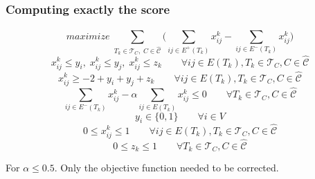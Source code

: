 \documentclass{beamer}
\begin{document}
\begin{frame}[c]
	\frametitle{Computing exactly the score}
	\begin{equation}
		maximize \; \sum_{ T_{k} \in \mathcal{T}_{C}, \; C \in
			\mathcal{\hat{C}} } \big( \sum^{}_{ij \in E^{+} (T_{k})} x_{ij}
			^{k} - \sum_{ij \in E^{-} (T_{k})} x_{ij} ^{k} \big)
	\end{equation}
	\begin{equation}
		x _{ij}^{k}  \leq y_i, \; x _{ij} ^{k} \leq y_j, \;x _{ij}^{k}  \leq z_k \quad\quad \forall ij \in E(T_{k}), T_{k} \in
		\mathcal{T}_{C}, C \in \mathcal{\hat{C}}
	\end{equation}
	\begin{equation}
		x _{ij} ^{k} \geq - 2 + y_i + y_j + z_k \quad\quad \forall ij \in E(T_k), T_k \in \mathcal{T} _{C}, C \in \hat{\mathcal{C} }
	\end{equation}
	\begin{equation}
		\sum^{}_{ij \in E^{-} (T_k)} x_{ij}^{k}  - \alpha \sum^{}_{ij \in E(T_k)}
		x_{ij} ^{k}  \leq 0 \quad\quad \forall T_{k} \in \mathcal{T} _{C}, C \in
		\hat{\mathcal{C}}
	\end{equation}
	\begin{equation}
		y _{i} \in  \{0, 1\} \quad\quad \forall i \in V
	\end{equation}
	\begin{equation}
		0 \leq x _{ij} ^{k}  \leq 1 \quad\quad \forall ij \in E(T_{k}), T_{k} \in
		\mathcal{T}_{C}, C \in \mathcal{\hat{C}}
	\end{equation}
	\begin{equation}
		0 \leq z _{k} \leq 1 \quad\quad \forall T_{k} \in \mathcal{T} _{C}, C \in
		\hat{\mathcal{C}}
	\end{equation}

	For $\alpha \leq 0.5$. Only the objective function needed to be corrected.
\end{frame}
\end{document}
